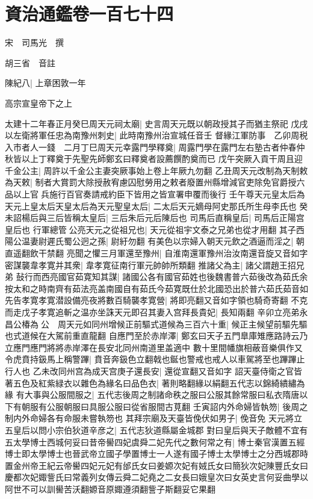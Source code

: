 \chapter{資治通鑑卷一百七十四}
宋　司馬光　撰

胡三省　音註

陳紀八|{
	上章困敦一年}


高宗宣皇帝下之上

太建十二年春正月癸巳周天元祠太廟|{
	史言周天元既以朝政授其子而猶主祭祀}
戊戌以左衛將軍任忠為南豫州刺史|{
	此時南豫州治宣城任音壬}
督緣江軍防事　乙卯周税入市者人一錢　二月丁巳周天元幸露門學釋奠|{
	周露門學在露門左右塾古者仲春仲秋皆以上丁釋奠于先聖先師鄭玄曰釋奠者設薦饌酌奠而已}
戊午突厥入貢干周且迎千金公主|{
	周許以千金公主妻突厥事始上卷上年厥九勿翻}
乙丑周天元改制為天制敕為天敕|{
	制者大賞罰大除授赦宥慮囚慰勞用之敕者廢置州縣增減官吏除免官爵授六品以上官兵施行百官奏請戒約臣下皆用之皆宣署申覆而後行}
壬午尊天元皇太后為天元上皇太后天皇太后為天元聖皇太后|{
	二太后天元嫡母阿史那氏所生母李氏也}
癸未詔楊后與三后皆稱太皇后|{
	三后朱后元后陳后也}
司馬后直稱皇后|{
	司馬后正陽宫皇后也}
行軍總管公亮天元之從祖兄也|{
	天元從祖宇文泰之兄弟也從才用翻}
其子西陽公温妻尉遲氏蜀公迥之孫|{
	尉紆勿翻}
有美色以宗婦入朝天元飲之酒逼而淫之|{
	朝直遥翻飲干禁翻}
亮聞之懼三月軍還至豫州|{
	自淮南還軍豫州治汝南還音旋又音如字}
密謀襲韋孝寛并其衆|{
	韋孝寛征南行軍元帥帥所類翻}
推諸父為主|{
	諸父謂趙王招兄弟}
鼔行而西亮國官茹寛知其謀|{
	諸國公各有國官茹姓也後魏書普六茹後改為茹氏余按太和之時南齊有茹法亮盖南國自有茹氏今茹寛既仕於北國恐出於普六茹氏茹音如}
先告孝寛孝寛潜設備亮夜將數百騎襲孝寛營|{
	將即亮翻又音如字領也騎奇寄翻}
不克而走戊子孝寛追斬之温亦坐誅天元即召其妻入宫拜長貴妃|{
	長知兩翻}
辛卯立亮弟永昌公椿為公　周天元如同州增候正前驅式道候為三百六十重|{
	候正主候望前驅先驅也式道候在大駕前重直龍翻}
自應門至於赤岸澤|{
	鄭玄曰天子五門臯庫雉應路詩云乃立應門應門將將赤岸澤在長安北同州南道里盖適中}
數十里間幡旗相蔽音樂俱作又令虎賁持鈒馬上稱警蹕|{
	賁音奔鈒色立翻戟也鋋也警戒也戒人以車駕將至也蹕蹕止行人也}
乙未改同州宫為成天宫庚子還長安|{
	還從宣翻又音如字}
詔天臺侍衛之官皆著五色及紅紫緑衣以雜色為緣名曰品色衣|{
	著則略翻緣以絹翻五代志以錦綺繢繡為緣}
有大事與公服間服之|{
	五代志後周之制諸命秩之服曰公服其餘常服曰私衣隋唐以下有朝服有公服朝服曰具服公服曰從省服間古莧翻}
壬寅詔内外命婦皆執笏|{
	後周之制内外命婦各有命服未嘗執笏也}
其拜宗廟及天臺皆俛伏如男子|{
	俛音免}
天元將立五皇后以問小宗伯狄道辛彦之|{
	五代志狄道縣屬金城郡}
對曰皇后與天子敵體不宜有五太學博士西城何妥曰昔帝嚳四妃虞舜二妃先代之數何常之有|{
	博士秦官漢置五經博士即太學博士也晉武帝立國子學置博士一人遂有國子博士太學博士之分西城郡時置金州帝王紀云帝嚳四妃元妃有邰氏女曰姜嫄次妃有娀氏女曰簡狄次妃陳豐氏女曰慶都次妃娵訾氏曰常義列女傳云舜二妃堯之二女長曰娥皇次曰女英史言何妥曲學以阿世不可以訓嚳苦沃翻嫄音原娵遵須翻訾子斯翻妥它果翻}
